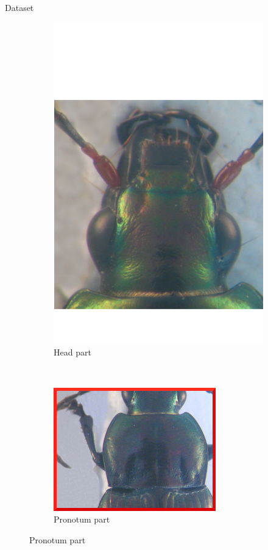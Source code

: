 \documentclass[10pt,svgnames]{beamer}
\begin{document}
\begin{frame}[c]{Dataset}
\begin{figure}[htbp]
\begin{subfigure}[t]{0.3\textwidth}
        			\centering
        			\includegraphics[scale=.2]{images/tete2}
        			\caption*{\footnotesize{Head part}}
        			\label{figsub22}
    			\end{subfigure}
    			~ 
    			\begin{subfigure}[t]{0.33\textwidth}
        			\centering
        			\includegraphics[scale=1.1]{images/pronotum}
        			\caption*{\footnotesize{Pronotum part}}
        			\label{figsub22}
    			\end{subfigure}
			\end{figure}
\end{frame}
\end{document}
